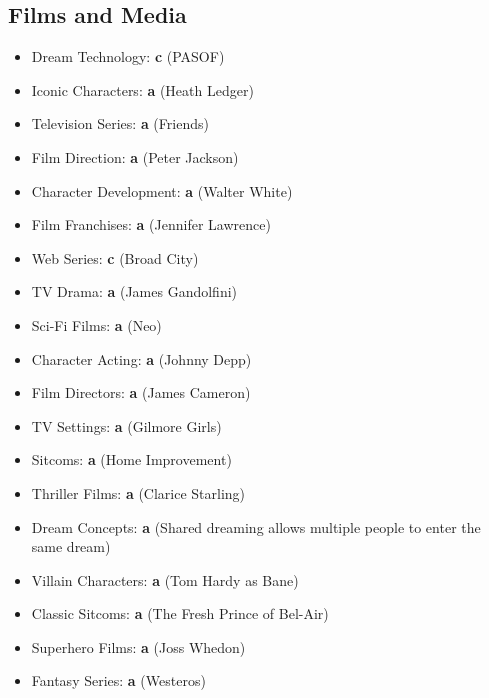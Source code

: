 \documentclass[12pt,a4paper]{book}
\begin{document}
\subsection{Films and Media}
\begin{itemize}
\item Dream Technology: \textbf{c} (PASOF)
\item Iconic Characters: \textbf{a} (Heath Ledger)
\item Television Series: \textbf{a} (Friends)
\item Film Direction: \textbf{a} (Peter Jackson)
\item Character Development: \textbf{a} (Walter White)
\item Film Franchises: \textbf{a} (Jennifer Lawrence)
\item Web Series: \textbf{c} (Broad City)
\item TV Drama: \textbf{a} (James Gandolfini)
\item Sci-Fi Films: \textbf{a} (Neo)
\item Character Acting: \textbf{a} (Johnny Depp)
\item Film Directors: \textbf{a} (James Cameron)
\item TV Settings: \textbf{a} (Gilmore Girls)
\item Sitcoms: \textbf{a} (Home Improvement)
\item Thriller Films: \textbf{a} (Clarice Starling)
\item Dream Concepts: \textbf{a} (Shared dreaming allows multiple people to enter the same dream)
\item Villain Characters: \textbf{a} (Tom Hardy as Bane)
\item Classic Sitcoms: \textbf{a} (The Fresh Prince of Bel-Air)
\item Superhero Films: \textbf{a} (Joss Whedon)
\item Fantasy Series: \textbf{a} (Westeros)
\end{itemize}
\end{document}
